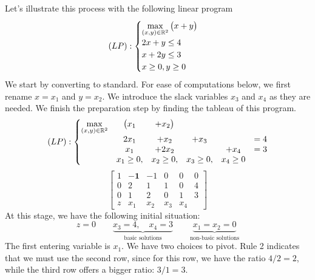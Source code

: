 \begin{example}
Let's illustrate this process with the following linear program
\begin{equation*}
(LP): \begin{cases}
\displaystyle{\max_{(x,y) \in \mathbb{R}^2} \big( x+y \big)} \\
2x+y \leq 4 \\
x+2y \leq 3 \\
x \geq 0, y \geq 0
\end{cases}
\end{equation*}
We start by converting to standard.  For ease of computations below, we first rename $x=x_1$ and $y=x_2$.  We introduce the slack variables $x_3$ and $x_4$ as they are needed.  We finish the preparation step by finding the tableau of this program.
\begin{equation*}
(LP): \left\{
\begin{matrix}
\displaystyle{\max_{(x,y) \in \mathbb{R}^2}} &\big( x_1   & +x_2 \big) \\
                                            &2x_1        & +x_2        & +x_3        &          &= 4 \\
                                            &x_1         & +2x_2       &             & +x_4     &= 3 \\
                                            &x_1 \geq 0, & x_2 \geq 0, & x_3 \geq 0, &x_4 \geq 0
\end{matrix}
\right.
\end{equation*}
\begin{equation*}
\begin{bmatrix}
1 & \boldsymbol{-1}  & -1  & 0   & 0   & 0\\
0 & 2                & 1   & 1   & 0   & 4 \\
0 & 1                & 2   & 0   & 1   & 3 \\ \hline
z & x_1              & x_2 & x_3 & x_4 
\end{bmatrix}
\end{equation*}
At this stage, we have the following initial situation:
\begin{equation*}
z=0 \qquad \underbrace{x_3=4, \quad x_4=3}_{\text{basic solutions}} \qquad \underbrace{x_1=x_2=0}_{\text{non-basic solutions}}
\end{equation*}
The first entering variable is $x_1$.  We have two choices to pivot.  Rule 2 indicates that we must use the second row, since for this row, we have the ratio $4/2 = 2$, while the third row offers a bigger ratio: $3/1=3$.

\end{example}
